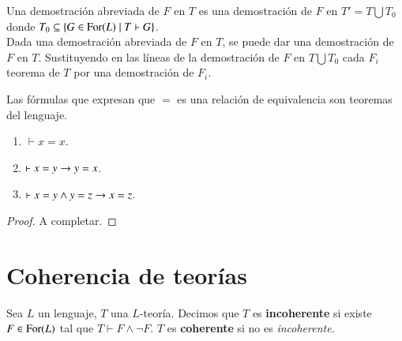 \begin{obs}
    Una demostración abreviada de $F$ en $T$ es una demostración de $F$ en $T' = T \bigcup T_0$ donde $T_0 \subseteq \left\{G \in \mathrm{For}(L) \mid T \vdash G\right\}$.\\

    Dada una demostración abreviada de $F$ en $T$, se puede dar una demostración de $F$ en $T$. Sustituyendo en las líneas de la demostración de $F$ en $T \bigcup T_0$ cada $F_i$ teorema de $T$ por una demostración de $F_i$.
\end{obs}

\begin{pro}[$=$ como relación de equivalencia]\label{pro:2.1}
    Las fórmulas que expresan que $=$ es una relación de equivalencia son teoremas del lenguaje.
    \begin{enumerate}
        \item $\vdash x = x$.
        \item $\vdash x = y \rightarrow y = x$.
        \item $\vdash x = y \land y = z \rightarrow x = z$.
    \end{enumerate}
\end{pro}
\begin{proof}
    A completar. %
\end{proof}

\section{Coherencia de teorías}
\begin{dfn}
    Sea $L$ un lenguaje, $T$ una $L$-teoría. Decimos que $T$ es \textbf{incoherente} si existe $F \in \mathrm{For}(L)$ tal que $T \vdash F \land \neg F$. $T$ es \textbf{coherente} si no es \textit{incoherente}.
\end{dfn}

